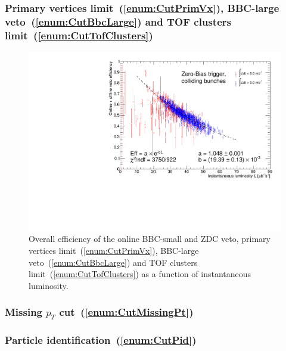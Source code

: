 \subsubsection{Primary vertices limit~(\ref{enum:CutPrimVx}), BBC-large veto~(\ref{enum:CutBbcLarge}) and TOF clusters limit~(\ref{enum:CutTofClusters})}
\begin{figure}[ht!]
\centering%
\includegraphics[width=0.65\linewidth,page=1]{graphics/corrections/OnlineAndOfflineVetoEffVsInstLumi_graph.pdf}%
\caption{Overall efficiency of the online BBC-small and ZDC veto, primary vertices limit~(\ref{enum:CutPrimVx}), BBC-large veto~(\ref{enum:CutBbcLarge}) and TOF clusters limit~(\ref{enum:CutTofClusters}) as a function of instantaneous luminosity.}\label{fig:onlineAndOfflineVetoEff}%
\end{figure}
\subsubsection{Missing \texorpdfstring{$p_{T}$}{pT} cut~(\ref{enum:CutMissingPt})}
\subsubsection{Particle identification~(\ref{enum:CutPid})}


